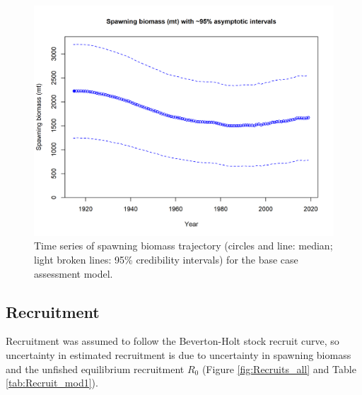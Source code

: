 \documentclass[12pt,]{article}
\begin{document}
\begin{figure}
\centering
\includegraphics{r4ss/plots_mod1/ts7_Spawning_biomass_(mt)_with_95_asymptotic_intervals_intervals.png}
\caption{Time series of spawning biomass trajectory (circles and line:
median; light broken lines: 95\% credibility intervals) for the base
case assessment model. \label{fig:Spawnbio_all}}
\end{figure}

\FloatBarrier

\hypertarget{recruitment}{%
\subsection*{Recruitment}\label{recruitment}}

Recruitment was assumed to follow the Beverton-Holt stock recruit curve,
so uncertainty in estimated recruitment is due to uncertainty in
spawning biomass and the unfished equilibrium recruitment \(R_0\)
(Figure \ref{fig:Recruits_all} and Table \ref{tab:Recruit_mod1}).

\vspace{.5cm}
\end{document}
